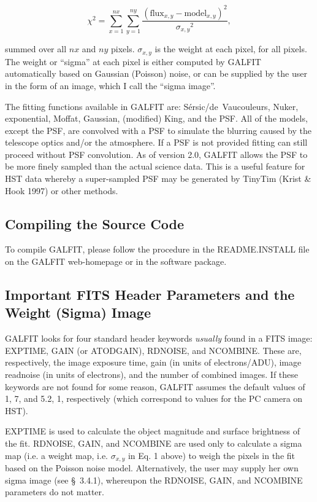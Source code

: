 \documentclass[preprint]{aastex}
\begin{document}
\begin {equation}
\chi^2 = \sum_{x=1}^{nx}\sum_{y=1}^{ny} \frac {\left(\mbox{flux}_{x,y} - \mbox{model}_{x,y}\right)^2} {{\sigma_{x,y}}^2},
\end {equation}

\noindent summed over all $nx$ and $ny$ pixels.  $\sigma_{x,y}$ is the weight
at each pixel, for all pixels.  The weight or ``sigma'' at each pixel is
either computed by GALFIT automatically based on Gaussian (Poisson) noise, or
can be supplied by the user in the form of an image, which I call the ``sigma
image''.

The fitting functions available in GALFIT are:  S\'ersic/de~Vaucouleurs,
Nuker, exponential, Moffat, Gaussian, (modified) King, and the PSF.  All of
the models, except the PSF, are convolved with a PSF to simulate the blurring
caused by the telescope optics and/or the atmosphere.  If a PSF is not
provided fitting can still proceed without PSF convolution.  As of version
2.0, GALFIT allows the PSF to be more finely sampled than the actual science
data.  This is a useful feature for HST data whereby a super-sampled PSF may
be generated by TinyTim (Krist \& Hook 1997) or other methods.

\subsection {Compiling the Source Code}

To compile GALFIT, please follow the procedure in the README.INSTALL file on
the GALFIT web-homepage or in the software package.

\subsection {Important FITS Header Parameters and the Weight (Sigma) Image}

GALFIT looks for four standard header keywords {\it usually} found in a FITS
image: EXPTIME, GAIN (or ATODGAIN), RDNOISE, and NCOMBINE.  These are,
respectively, the image exposure time, gain (in units of electrons/ADU), image
readnoise (in units of electrons), and the number of combined images.  If
these keywords are not found for some reason, GALFIT assumes the default
values of 1, 7, and 5.2, 1, respectively (which correspond to values for the
PC camera on HST).

EXPTIME is used to calculate the object magnitude and surface brightness of
the fit.  RDNOISE, GAIN, and NCOMBINE are used only to calculate a sigma map
(i.e. a weight map, i.e. $\sigma_{x,y}$ in Eq. 1 above) to weigh the pixels in
the fit based on the Poisson noise model.  Alternatively, the user may supply
her own sigma image (see \S~3.4.1), whereupon the RDNOISE, GAIN, and NCOMBINE
parameters do not matter.
\end{document}
